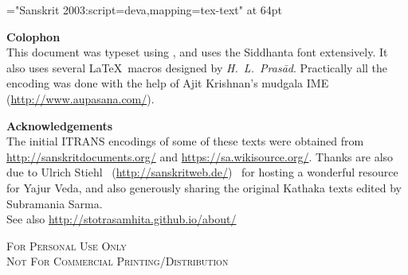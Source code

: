 \thispagestyle{empty}\clearpage
\begin{titlepage}
\vspace*{4.5cm}
\begin{center}
{\font\x="Sanskrit 2003:script=deva,mapping=tex-text" at 64pt \x \titletext}
\end{center}
\end{titlepage}

\begin{center}
\parbox{0.85\linewidth}{
{\Large \textbf{Colophon}}\\
\noindent\fontsize{10}{12}\selectfont  This document was typeset using \XeLaTeX, and uses the Siddhanta font extensively. It also uses several \LaTeX\ macros designed by \textit{H.~L.~Prasād}. Practically all the encoding was done with the help of Ajit Krishnan's mudgala IME (\url{http://www.aupasana.com/}).
\vspace*{2cm}

{\large \textbf{Acknowledgements}}\\
\fontsize{10}{12}\selectfont The initial ITRANS encodings of some of these texts were obtained from \url{http://sanskritdocuments.org/} and \url{https://sa.wikisource.org/}. Thanks are also due to Ulrich Stiehl~ (\url{http://sanskritweb.de/}) ~for hosting a wonderful resource for Yajur Veda, and also generously sharing the original Kathaka texts edited by Subramania Sarma. \\
See also \url{http://stotrasamhita.github.io/about/}
\vspace*{1cm}
%
\begin{center}
{\normalsize \scshape{For Personal Use Only\\
 Not For Commercial Printing/Distribution}}
\end{center}
}
\end{center}
\clearemptydoublepage %
\setcounter{page}{0} %
\renewcommand{\chaptermark}[1]{%
\markboth{#1}{}} %
\tableofcontents

\mbox{}
\clearpage
\thispagestyle{empty}
\clearemptydoublepage
